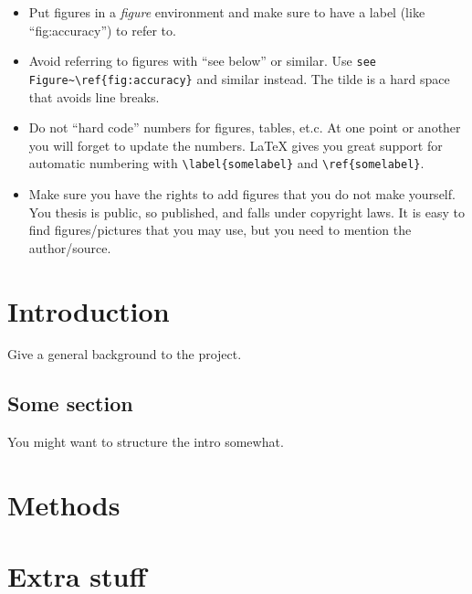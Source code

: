 \documentclass[10pt, a4paper, two-sided,]{scrbook}
\begin{document}
\begin{itemize}
\item Put figures in a \emph{figure} environment and make sure to have a label (like ``fig:accuracy'') to refer to. 
\item Avoid referring to figures with ``see below'' or similar. Use \verb+see Figure~\ref{fig:accuracy}+ and similar instead. The tilde is a hard space that avoids line breaks.
\item Do not ``hard code'' numbers for figures, tables, et.c. At one point or another you will forget to update the numbers. LaTeX gives you great support for automatic numbering with \verb|\label{somelabel}| and \verb|\ref{somelabel}|.
\item Make sure you have the rights to add figures that you do not make yourself. You thesis is
  public, so published, and falls under copyright laws. It is easy to find figures/pictures that you
  may use, but you need to mention the author/source.
\end{itemize}



\chapter{Introduction}
\label{cha:introduction}

Give a general background to the project.


\section{Some section}
\label{sec:some-section}

You might want to structure the intro somewhat.




\lipsum[1-3]

\chapter{Methods}
\label{cha:methods}

\lipsum[4-5]


%
% 
\appendix

\chapter{Extra stuff}
\label{cha:extra-stuff}
\end{document}
